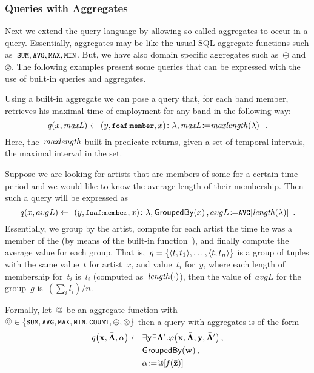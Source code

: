 \subsubsection*{Queries with Aggregates} 
\label{sec:aggr}

Next we extend the query language by allowing so-called aggregates to occur in a query. Essentially, aggregates may be
like the usual SQL aggregate functions such as~$\texttt{{\small SUM}}, \texttt{{\small AVG}}, \texttt{{\small MAX}}, \texttt{{\small MIN}}$. But, we
have also domain specific aggregates such as~$\oplus$ and~$\otimes$.
%
The following examples present some queries that can be expressed with the use of built-in queries and aggregates.

\begin{example}
  Using a built-in aggregate we can pose a query that, for each band member, retrieves his maximal time of employment
  for any band in the following way:
  \[
  \mathit{q}\!\left(x, \mathit{maxL}\right) \leftarrow \mbox{$(y, \mbox{\small$\mathtt{foaf{:}member}$}, x)\colon\lambda$}, \mathit{maxL} \mbox{$\colon\!\!\!\!=$}
  \mathit{maxlength}\!\left(\lambda\right) \enspace .
  \]
  \nd Here, the~$\mathit{maxlength}$ built-in predicate returns, given a set of temporal intervals, the maximal interval
  in the set.
\end{example}

\begin{example}
  \label{exAA}
  Suppose we are looking for artists that are members of some  for a certain time period and we
  would like to know the average length of their membership. Then such a query will be expressed as
  \[
    \mathit{q}\!\left(x, avgL\right) \leftarrow~  \mbox{$(y, \mbox{\small$\mathtt{foaf{:}member}$}, x)\colon\lambda$},\mathit{\mathsf{GroupedBy}}\!\left(x\right),
                            avgL \mbox{$\colon\!\!\!\!=$} \texttt{{\small AVG}}[\mathit{length}\!\left(\lambda\right)] \enspace .
  \]
  \nd Essentially, we group by the artist, compute for each artist the time he was a member of the
   (by means of the built-in function~), and finally compute the average value
  for each group.
  That is,~$g = \{\langle t, t_{1} \rangle,\ldots, \langle t, t_{n} \rangle\}$ is a group of tuples with the same value~$t$ for
  artist~$x$, and value~$t_{i}$ for~$y$, where each length of membership for~$t_{i}$ is~$l_{i}$ (computed
  as~$\mathit{length}\!\left(\cdot\right)$), then the value of~$avgL$ for the group~$g$ is~$(\sum_{i} l_{i})/n$.
\end{example}

\nd Formally, let~$@$ be an aggregate function with~$@ \in \{\texttt{{\small SUM}}, \texttt{{\small AVG}}, \texttt{{\small MAX}},
\texttt{{\small MIN}}, \texttt{{\small COUNT}}, \oplus, \otimes\}$ then a query with aggregates is of the form
\begin{align*}
  \funcCall{q}{\vec{x}, \vec{\Lambda},\alpha} \leftarrow~ & \exists \vec{y}\exists\mathbf{\Lambda}'.\funcCall{\varphi}{\vec{x}, \vec{\Lambda}, \vec{y},\vec{\Lambda}'},\\
  & \funcCall{\mathsf{GroupedBy}}{\vec{w}},\\
  & \alpha \assign\aggr[\funcCall{f}{\vec{z}}]
\end{align*}

